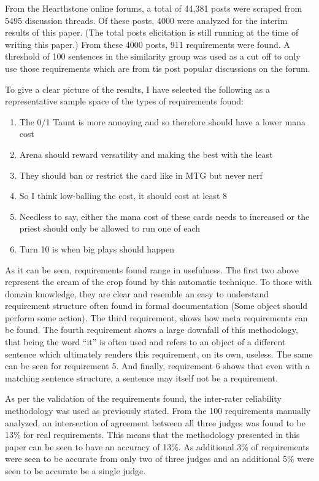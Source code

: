 \documentclass[conference]{IEEEtran}
\begin{document}
From the Hearthstone online forums, a total of 44,381 posts were scraped from 5495 discussion threads. Of
these posts, 4000 were analyzed for the interim results of this paper. (The total posts elicitation is still
running at the time of writing this paper.) From these 4000 posts, 911 requirements were found. A threshold of
100 sentences in the similarity group was used as a cut off to only use those requirements which are from
tis post popular discussions on the forum.

To give a clear picture of the results, I have selected the following as a representative sample space of the
types of requirements found:

\begin{enumerate}
  \item The 0/1 Taunt is more annoying and so therefore should have a lower mana cost
  \item Arena should reward versatility and making the best with the least
  \item They should ban or restrict the card like in MTG but never nerf
  \item So I think low-balling the cost, it should cost at least 8
  \item Needless to say, either the mana cost of these cards needs to increased or the priest should only be allowed to run one of each
  \item Turn 10 is when big plays should happen
\end{enumerate}

As it can be seen, requirements found range in usefulness. The first two above represent the cream of the crop found
by this automatic technique. To those with domain knowledge, they are clear and resemble an easy to understand
requirement structure often found in formal documentation (Some object should perform some action). The third requirement,
shows how meta requirements can be found. The fourth requirement shows a large downfall of this methodology, that being
the word ``it'' is often used and refers to an object of a different sentence which ultimately renders this requirement,
on its own, useless. The same can be seen for requirement 5. And finally, requirement 6 shows that even with a matching
sentence structure, a sentence may itself not be a requirement.

As per the validation of the requirements found, the inter-rater reliability methodology was used as previously stated.
From the 100 requirements manually analyzed, an intersection of agreement between all three judges was found to be 13\%
for real requirements. This means that the methodology presented in this paper can be seen to have an accuracy of 13\%.
As additional 3\% of requirements were seen to be accurate from only two of three judges and an additional 5\% were seen
to be accurate be a single judge.
\end{document}
